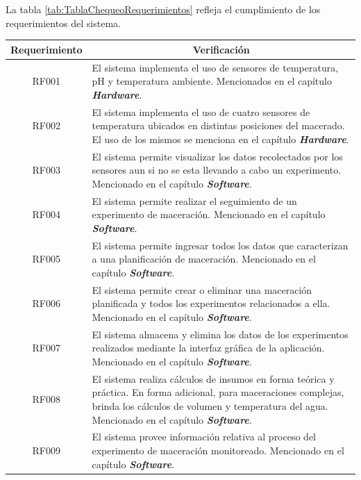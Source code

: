 \par La tabla \ref{tab:TablaChequeoRequerimientos} refleja el cumplimiento de los requerimientos del sistema.
 \begin{table}[H]
     \centering
     \begin{tabularx}{\textwidth}{|X|X|}
     \hline
     \multicolumn{1}{|c|}{Requerimiento} & \multicolumn{1}{|c|}{Verificación}\\
     \hline
     \hline
        \multicolumn{1}{|c|}{RF001}  & El sistema implementa el uso de sensores de temperatura, pH y temperatura ambiente. Mencionados en el capítulo \textit{\textbf{Hardware}}. \\
        \hline
        \multicolumn{1}{|c|}{RF002}  & El sistema implementa el uso de cuatro sensores de temperatura ubicados en distintas posiciones del macerado. El uso de los mismos se menciona en el capítulo \textit{\textbf{Hardware}}. \\
        \hline
        \multicolumn{1}{|c|}{RF003}  & El sistema permite visualizar los datos recolectados por los sensores aun si no se esta llevando a cabo un experimento. Mencionado en el capítulo \textit{\textbf{Software}}. \\
        \hline
        \multicolumn{1}{|c|}{RF004}  & El sistema permite realizar el seguimiento de un experimento de maceración.  Mencionado en el capítulo \textit{\textbf{Software}}.   \\
        \hline
        \multicolumn{1}{|c|}{RF005}  & El sistema permite ingresar todos los datos que caracterizan a una planificación de maceración. Mencionado en el capítulo \textit{\textbf{Software}}.  \\
        \hline
        \multicolumn{1}{|c|}{RF006}  & El sistema permite crear o eliminar una maceración planificada y todos los experimentos relacionados a ella. Mencionado en el capítulo \textit{\textbf{Software}}. \\
        \hline
        \multicolumn{1}{|c|}{RF007}  & El sistema almacena y elimina los datos de los experimentos realizados mediante la interfaz gráfica de la aplicación. Mencionado en el capítulo \textit{\textbf{Software}}. \\
        \hline
        \multicolumn{1}{|c|}{RF008}  & El sistema realiza cálculos de insumos en forma teórica y práctica. En forma adicional, para maceraciones complejas, brinda los cálculos de volumen y temperatura del agua. Mencionado en el capítulo \textit{\textbf{Software}}. \\
        \hline
        \multicolumn{1}{|c|}{RF009}  & El sistema provee información relativa al proceso del experimento de maceración  monitoreado. Mencionado en el capítulo \textit{\textbf{Software}}.  \\

\end{tabularx}
\end{table}
